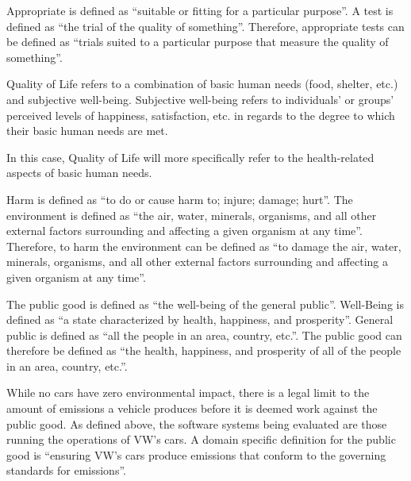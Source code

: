 Appropriate is defined as ``suitable or fitting for a particular purpose''\cite{dictionary_com}. A test is defined as ``the trial of the quality of something''\cite{dictionary_com}. Therefore, appropriate tests can be defined as ``trials suited to a particular purpose that measure the quality of something''.

Quality of Life\cite{quality_of_life} refers to a combination of basic human needs (food, shelter, etc.) and subjective well-being. Subjective well-being refers to individuals' or groups' perceived levels of happiness, satisfaction, etc. in regards to the degree to which their basic human needs are met.

In this case, Quality of Life will more specifically refer to the health-related aspects of basic human needs\cite{quality_of_life}.

Harm is defined as ``to do or cause harm to; injure; damage; hurt''\cite{dictionary_com}. The environment is defined as ``the air, water, minerals, organisms, and all other external factors surrounding and affecting a given organism at any time''\cite{dictionary_com}. Therefore, to harm the environment can be defined as ``to damage the air, water, minerals, organisms, and all other external factors surrounding and affecting a given organism at any time''.

The public good is defined as ``the well-being of the general public''\cite{dictionary_com}. Well-Being is defined as ``a state characterized by health, happiness, and prosperity''\cite{dictionary_com}. General public is defined as ``all the people in an area, country, etc.''\cite{merriam_webster}. The public good can therefore be defined as ``the health, happiness, and prosperity of all of the people in an area, country, etc.''.

While no cars have zero environmental impact\cite{tesla_env_impact}, there is a legal limit to the amount of emissions a vehicle produces before it is deemed work against the public good\cite{emissions_standards}. As defined above, the software systems being evaluated are those running the operations of VW's cars. A domain specific definition for the public good is ``ensuring VW's cars produce emissions that conform to the governing standards for emissions''.

